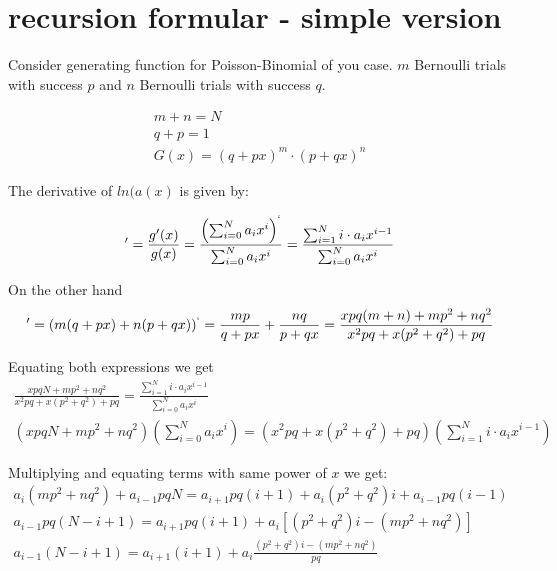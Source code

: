 \documentclass[11pt,draft]{article}
\title{}
\author{Maxim Zhilyaev \and David Zeber}
\begin{document}
\maketitle

\section{recursion formular - simple version}

Consider generating function for Poisson-Binomial of you case.  $m$ Bernoulli trials with success $p$ and $n$ Bernoulli trials with success $q$. 

\begin{align}
m+n = N \\
q+p = 1 \\
G(x) = (q+px)^m \cdot (p+qx)^n
\end{align}

The derivative of $ln(a(x)$ is given by:

\begin{align}
[ln(g(x)]' = \frac{g'(x)}{g(x)} = \frac{\left ( \sum_{i=0}^{N} a_i x^i \right )^`}{ \sum_{i=0}^{N} a_i x^i} = \frac{\sum_{i=1}^{N} i \cdot a_i x^{i-1}}{  \sum_{i=0}^{N} a_i x^i}
\end{align}

On the other hand
\begin{align}
[ln(g(x))]' = (m(q+px) + n(p+qx))^` = \frac{mp}{q+px} + \frac{nq}{p+qx} = \frac{xpq(m+n) + mp^2 + nq^2}{x^2pq + x(p^2 + q^2) + pq}
\end{align}

Equating both expressions we get
\begin{align}
\frac{xpqN + mp^2 + nq^2}{x^2pq + x(p^2 + q^2) + pq} = \frac{\sum_{i=1}^{N} i \cdot a_i x^{i-1}}{  \sum_{i=0}^{N} a_i x^i} \\
(xpqN + mp^2 + nq^2)(\sum_{i=0}^{N} a_i x^i) = (x^2pq + x(p^2 + q^2) + pq)(\sum_{i=1}^{N} i \cdot a_i x^{i-1})
\end{align}

Multiplying and equating terms with same power of $x$ we get:
\begin{align}
a_i(mp^2 + nq^2) + a_{i-1}pqN = a_{i+1}pq(i+1) + a_i(p^2 + q^2)i + a_{i-1}pq(i-1) \\
a_{i-1}pq(N - i +1) = a_{i+1}pq(i+1) + a_i[(p^2 + q^2)i - (mp^2 + nq^2)] \\
a_{i-1}(N - i +1) = a_{i+1}(i+1) + a_i\frac{(p^2 + q^2)i - (mp^2 + nq^2)}{pq}
\end{align}
\end{document}
